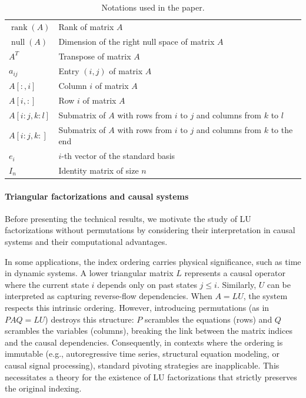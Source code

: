 \documentclass[10pt,twoside]{siamart1116}
\DeclareMathOperator{\rk}{rank}
\DeclareMathOperator{\nl}{null}
\numberwithin{theorem}{section}
\begin{document}
\begin{table}[htbp]
	\centering
	\begin{tabular}{ll}
		\toprule
		$\rk(A)$     & Rank of matrix $A$ \\
		$\nl(A)$     & Dimension of the right null space of matrix $A$ \\
		$A^T$        & Transpose of matrix $A$ \\
		$a_{ij}$     & Entry $(i,j)$ of matrix $A$ \\
		$A[:,i]$     & Column $i$ of matrix $A$ \\
		$A[i,:]$     & Row $i$ of matrix $A$ \\
		$A[i:j,k:l]$ & Submatrix of $A$ with rows from $i$ to $j$ and columns from $k$ to $l$ \\
		$A[i:j,k:]$  & Submatrix of $A$ with rows from $i$ to $j$ and columns from $k$ to the end \\
		$e_i$        & $i$-th vector of the standard basis \\
		$I_n$        & Identity matrix of size $n$ \\
		\bottomrule
	\end{tabular}
	\vspace{5pt}
	\caption{\label{tab:notations} Notations used in the paper.}
\end{table}

\paragraph{Triangular factorizations and causal systems} Before presenting the technical results, we motivate the study of LU factorizations without permutations by considering their interpretation in causal systems and their computational advantages.

In some applications, the index ordering carries physical significance, such as time in dynamic systems. A lower triangular matrix $L$ represents a causal operator where the current state $i$ depends only on past states $j \le i$. Similarly, $U$ can be interpreted as capturing reverse-flow dependencies. When $A=LU$, the system respects this intrinsic ordering. However, introducing permutations (as in $PAQ = LU$) destroys this structure: $P$ scrambles the equations (rows) and $Q$ scrambles the variables (columns), breaking the link between the matrix indices and the causal dependencies. Consequently, in contexts where the ordering is immutable (e.g., autoregressive time series, structural equation modeling, or causal signal processing), standard pivoting strategies are inapplicable. This necessitates a theory for the existence of LU factorizations that strictly preserves the original indexing.
\end{document}
